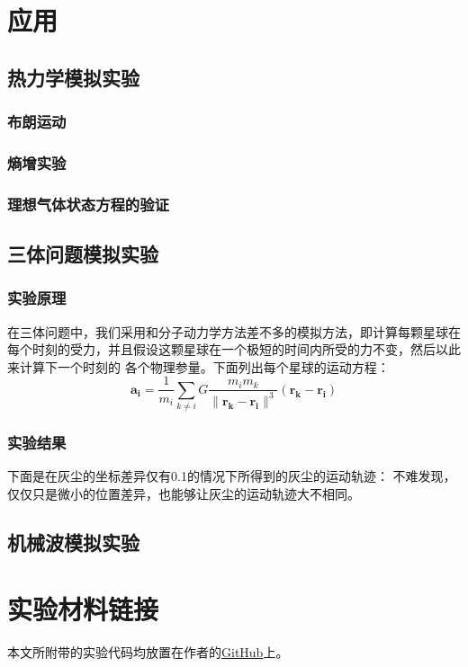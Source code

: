 ﻿\documentclass{article}
\begin{document}
	\section{应用}
	\subsection{热力学模拟实验}
	\subsubsection{布朗运动}
	\subsubsection{熵增实验}
	\subsubsection{理想气体状态方程的验证}
	\subsection{三体问题模拟实验}
	\subsubsection*{实验原理}
	在三体问题中，我们采用和分子动力学方法差不多的模拟方法，即计算每颗星球在每个时刻的受力，并且假设这颗星球在一个极短的时间内所受的力不变，然后以此来计算下一个时刻的
	各个物理参量。下面列出每个星球的运动方程：
	\[\mathbf{a_i} = \frac{1}{m_i}\sum_{k \neq i} G\frac{m_im_k}{\lVert \mathbf{r_k} - \mathbf{r_i} \rVert^3}(\mathbf{r_k} - \mathbf{r_i})\]
	\subsubsection*{实验结果}
	下面是在灰尘的坐标差异仅有0.1的情况下所得到的灰尘的运动轨迹：
	不难发现，仅仅只是微小的位置差异，也能够让灰尘的运动轨迹大不相同。
	\subsection{机械波模拟实验}
	\section{实验材料链接}
	本文所附带的实验代码均放置在作者的\href{https://github.com/PrayStarJirachi/OpenGL-Physical-Engine}{GitHub}上。
	
	
\end{document}
